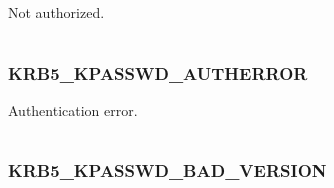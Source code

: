 \documentclass[letterpaper,10pt,english]{sphinxmanual}
\begin{document}
\begin{fulllineitems}
\label{appdev/refs/macros/KRB5_KPASSWD_ACCESSDENIED:KRB5_KPASSWD_ACCESSDENIED}
\end{fulllineitems}


Not authorized.

\begin{tabulary}{\linewidth}{|L|L|}
\hline

 & 
\\
\hline\end{tabulary}



\subsubsection{KRB5\_KPASSWD\_AUTHERROR}
\label{appdev/refs/macros/KRB5_KPASSWD_AUTHERROR:krb5-kpasswd-autherror-data}\label{appdev/refs/macros/KRB5_KPASSWD_AUTHERROR:krb5-kpasswd-autherror}\label{appdev/refs/macros/KRB5_KPASSWD_AUTHERROR::doc}

\begin{fulllineitems}
\label{appdev/refs/macros/KRB5_KPASSWD_AUTHERROR:KRB5_KPASSWD_AUTHERROR}
\end{fulllineitems}


Authentication error.

\begin{tabulary}{\linewidth}{|L|L|}
\hline

 & 
\\
\hline\end{tabulary}



\subsubsection{KRB5\_KPASSWD\_BAD\_VERSION}
\label{appdev/refs/macros/KRB5_KPASSWD_BAD_VERSION:krb5-kpasswd-bad-version-data}\label{appdev/refs/macros/KRB5_KPASSWD_BAD_VERSION:krb5-kpasswd-bad-version}\label{appdev/refs/macros/KRB5_KPASSWD_BAD_VERSION::doc}

\begin{fulllineitems}
\label{appdev/refs/macros/KRB5_KPASSWD_BAD_VERSION:KRB5_KPASSWD_BAD_VERSION}
\end{fulllineitems}
\end{document}

